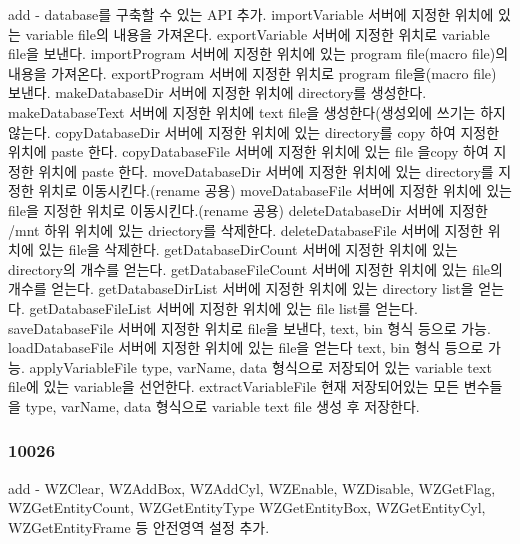 \begin{DoxyVerb}     add  - database를 구축할 수 있는 API 추가.
            importVariable 서버에 지정한 위치에 있는 variable file의 내용을 가져온다.
            exportVariable 서버에 지정한 위치로 variable file을 보낸다.
            importProgram 서버에 지정한 위치에 있는 program file(macro file)의 내용을 가져온다.
            exportProgram 서버에 지정한 위치로 program file을(macro file) 보낸다.
            makeDatabaseDir 서버에 지정한 위치에 directory를 생성한다.
            makeDatabaseText 서버에 지정한 위치에 text file을 생성한다(생성외에 쓰기는 하지 않는다.
            copyDatabaseDir 서버에 지정한 위치에 있는 directory를 copy 하여 지정한 위치에 paste 한다.
            copyDatabaseFile 서버에 지정한 위치에 있는 file 을copy 하여 지정한 위치에 paste 한다.
            moveDatabaseDir 서버에 지정한 위치에 있는 directory를 지정한 위치로 이동시킨다.(rename 공용)
            moveDatabaseFile 서버에 지정한 위치에 있는 file을 지정한 위치로 이동시킨다.(rename 공용)
            deleteDatabaseDir  서버에 지정한 /mnt 하위 위치에 있는 driectory를 삭제한다.
            deleteDatabaseFile 서버에 지정한 위치에 있는 file을 삭제한다.
            getDatabaseDirCount 서버에 지정한 위치에 있는 directory의 개수를 얻는다.
            getDatabaseFileCount 서버에 지정한 위치에 있는 file의 개수를 얻는다.
            getDatabaseDirList 서버에 지정한 위치에 있는 directory list을 얻는다.
            getDatabaseFileList 서버에 지정한 위치에 있는 file list를 얻는다.
            saveDatabaseFile 서버에 지정한 위치로 file을 보낸다, text, bin 형식 등으로 가능.
            loadDatabaseFile 서버에 지정한 위치에 있는 file을 얻는다 text, bin 형식 등으로 가능.
            applyVariableFile type, varName, data 형식으로 저장되어 있는 variable text file에 있는 variable을
            선언한다.
            extractVariableFile 현재 저장되어있는 모든 변수들을 type, varName, data 형식으로 variable text file
            생성 후 저장한다.
\end{DoxyVerb}


\subsubsection*{10026 }

\begin{DoxyVerb}     add  - WZClear, WZAddBox, WZAddCyl, WZEnable, WZDisable, WZGetFlag, WZGetEntityCount, WZGetEntityType
            WZGetEntityBox, WZGetEntityCyl, WZGetEntityFrame 등 안전영역 설정 추가.
\end{DoxyVerb}


